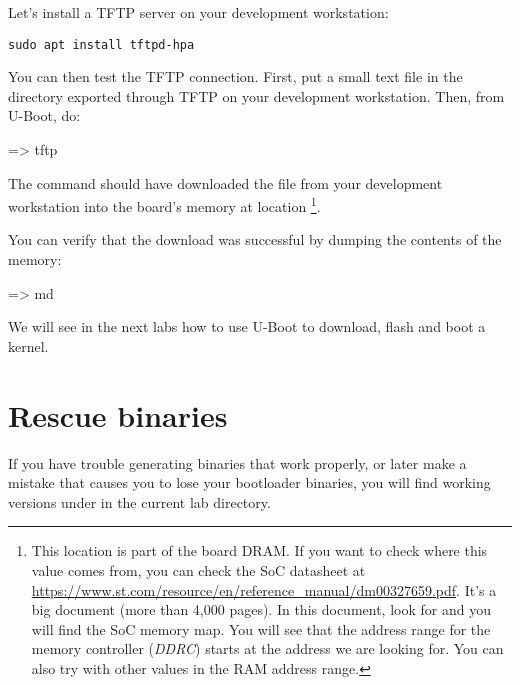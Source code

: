 Let's install a TFTP server on your development workstation:

\begin{verbatim}
sudo apt install tftpd-hpa
\end{verbatim}

You can then test the TFTP connection. First, put a small text file in
the directory exported through TFTP on your development
workstation. Then, from U-Boot, do:

\begin{ubootinput}
=> tftp %
\end{ubootinput}

The  command should have downloaded the
 file from your development workstation into
the board's memory at location {\tt \zimageboardaddr}\footnote{
This location is part of the board DRAM. If you want
to check where this value comes from, you can check the SoC
datasheet at
\url{https://www.st.com/resource/en/reference_manual/dm00327659.pdf}.
It's a big document (more than 4,000 pages). In this document, look
for  and you will find the SoC memory map.
You will see that the address range for the memory controller
({\em DDRC})
starts at the address we are looking for.
You can also try with other values in the RAM address range.}.

You can verify that the download was successful by dumping the
contents of the memory:

\begin{ubootinput}
=> md %
\end{ubootinput}

We will see in the next labs how to use U-Boot to download, flash and
boot a kernel.



\section{Rescue binaries}

If you have trouble generating binaries that work properly, or later
make a mistake that causes you to lose your bootloader binaries, you
will find working versions under  in the current lab
directory.
